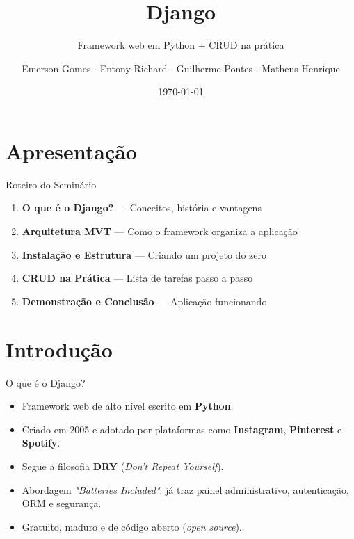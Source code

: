 \documentclass[aspectratio=169, 11pt]{beamer}
\title{Django}
\subtitle{Framework web em Python + CRUD na prática}
\author{Emerson Gomes \texorpdfstring{$\cdot$}{-} Entony Richard \texorpdfstring{$\cdot$}{-} Guilherme Pontes \texorpdfstring{$\cdot$}{-} Matheus Henrique}
\institute{Instituto Federal de Alagoas}
\date{\today}
\begin{document}
{
\begin{frame}[plain]
  \titlepage
\end{frame}
}

\section{Apresentação}
\begin{frame}{Roteiro do Seminário}
  \vspace{0.2cm}
  \begin{enumerate}
    \setlength\itemsep{0.6em}
    \item \textbf{O que é o Django?} --- Conceitos, história e vantagens
    \item \textbf{Arquitetura MVT} --- Como o framework organiza a aplicação
    \item \textbf{Instalação e Estrutura} --- Criando um projeto do zero
    \item \textbf{CRUD na Prática} --- Lista de tarefas passo a passo
    \item \textbf{Demonstração e Conclusão} --- Aplicação funcionando
  \end{enumerate}
\end{frame}

\section{Introdução}

\begin{frame}{O que é o Django?}
  \begin{itemize}
    \setlength\itemsep{0.55em}
    \item Framework web de alto nível escrito em \textbf{Python}.
    \item Criado em 2005 e adotado por plataformas como \textbf{Instagram}, \textbf{Pinterest} e \textbf{Spotify}.
    \item Segue a filosofia \textbf{DRY} (\textit{Don't Repeat Yourself}).
    \item Abordagem \textit{"Batteries Included"}: já traz painel administrativo, autenticação, ORM e segurança.
    \item Gratuito, maduro e de código aberto (\textit{open source}).
  \end{itemize}
\end{frame}
\end{document}
